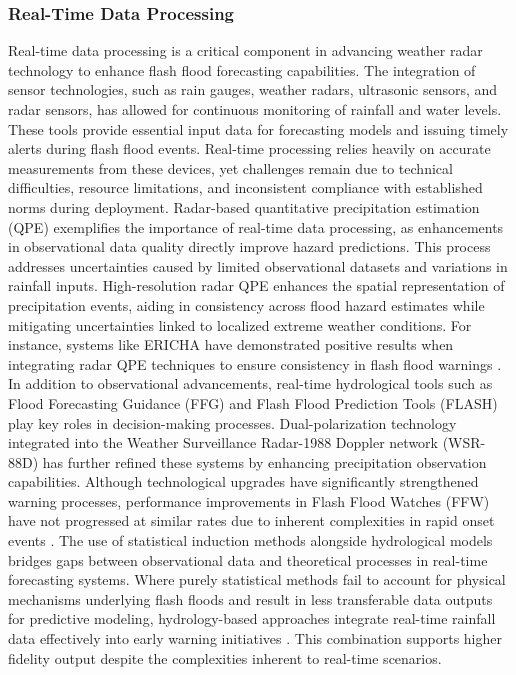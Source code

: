 \subsubsection{Real-Time Data Processing}
Real-time data processing is a critical component in advancing weather radar technology to enhance flash flood forecasting capabilities. The integration of sensor technologies, such as rain gauges, weather radars, ultrasonic sensors, and radar sensors, has allowed for continuous monitoring of rainfall and water levels. These tools provide essential input data for forecasting models and issuing timely alerts during flash flood events. Real-time processing relies heavily on accurate measurements from these devices, yet challenges remain due to technical difficulties, resource limitations, and inconsistent compliance with established norms during deployment.
Radar-based quantitative precipitation estimation (QPE) exemplifies the importance of real-time data processing, as enhancements in observational data quality directly improve hazard predictions. This process addresses uncertainties caused by limited observational datasets and variations in rainfall inputs. High-resolution radar QPE enhances the spatial representation of precipitation events, aiding in consistency across flood hazard estimates while mitigating uncertainties linked to localized extreme weather conditions. For instance, systems like ERICHA have demonstrated positive results when integrating radar QPE techniques to ensure consistency in flash flood warnings \citep{Msigwa2024}.
In addition to observational advancements, real-time hydrological tools such as Flood Forecasting Guidance (FFG) and Flash Flood Prediction Tools (FLASH) play key roles in decision-making processes. Dual-polarization technology integrated into the Weather Surveillance Radar-1988 Doppler network (WSR-88D) has further refined these systems by enhancing precipitation observation capabilities. Although technological upgrades have significantly strengthened warning processes, performance improvements in Flash Flood Watches (FFW) have not progressed at similar rates due to inherent complexities in rapid onset events \citep{Martinaitis2023}.
The use of statistical induction methods alongside hydrological models bridges gaps between observational data and theoretical processes in real-time forecasting systems. Where purely statistical methods fail to account for physical mechanisms underlying flash floods and result in less transferable data outputs for predictive modeling, hydrology-based approaches integrate real-time rainfall data effectively into early warning initiatives \citep{Lu2021}. This combination supports higher fidelity output despite the complexities inherent to real-time scenarios.
